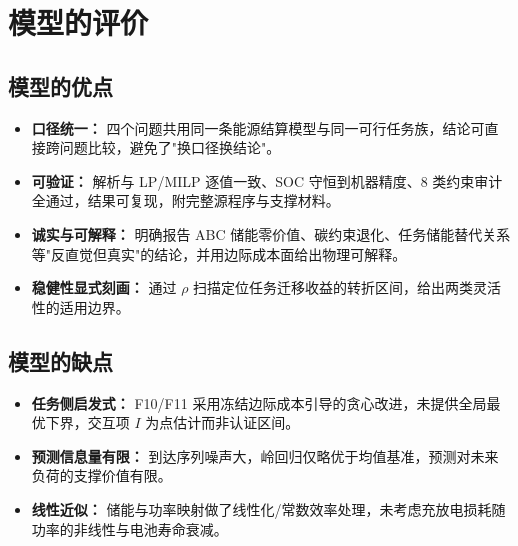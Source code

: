 \section{模型的评价}

\subsection{模型的优点}
\begin{itemize}[itemindent=2em]
\item \textbf{口径统一：} 四个问题共用同一条能源结算模型与同一可行任务族，结论可直接跨问题比较，避免了"换口径换结论"。
\item \textbf{可验证：} 解析与 LP/MILP 逐值一致、SOC 守恒到机器精度、8 类约束审计全通过，结果可复现，附完整源程序与支撑材料。
\item \textbf{诚实与可解释：} 明确报告 ABC 储能零价值、碳约束退化、任务储能替代关系等"反直觉但真实"的结论，并用边际成本面给出物理可解释。
\item \textbf{稳健性显式刻画：} 通过 $\rho$ 扫描定位任务迁移收益的转折区间，给出两类灵活性的适用边界。
\end{itemize}

\subsection{模型的缺点}
\begin{itemize}[itemindent=2em]
\item \textbf{任务侧启发式：} F10/F11 采用冻结边际成本引导的贪心改进，未提供全局最优下界，交互项 $I$ 为点估计而非认证区间。
\item \textbf{预测信息量有限：} 到达序列噪声大，岭回归仅略优于均值基准，预测对未来负荷的支撑价值有限。
\item \textbf{线性近似：} 储能与功率映射做了线性化/常数效率处理，未考虑充放电损耗随功率的非线性与电池寿命衰减。
\end{itemize}
